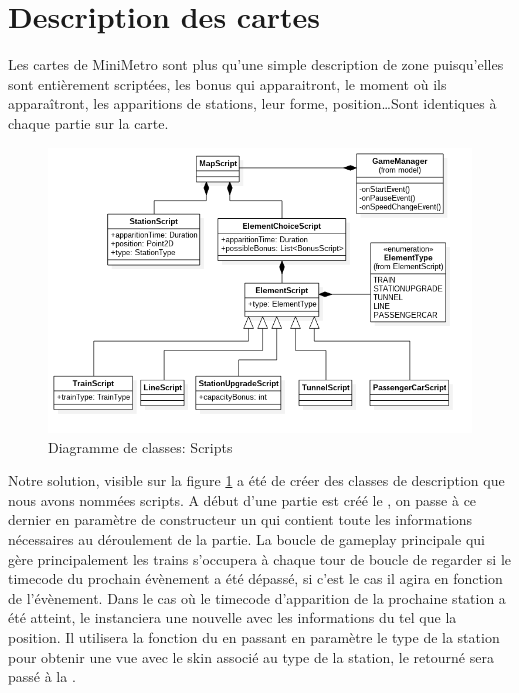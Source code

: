 \documentclass[report, backcover, french, nodocumentinfo]{upmethodology-document}
\begin{document}
		\section{Description des cartes}
				Les cartes de MiniMetro sont plus qu'une simple description de zone puisqu'elles sont entièrement scriptées, les bonus qui apparaitront, le moment où ils apparaîtront, les apparitions de stations, leur forme, position\ldots Sont identiques à chaque partie sur la carte.
				\begin{figure}[h!]
					\centering
					\includegraphics[width=\textwidth]{figures/ScriptsClassDiagram}
					\caption{Diagramme de classes: Scripts}
					\label{fig:ScriptsClassDiagram}
				\end{figure}
				Notre solution, visible sur la figure \ref{fig:ScriptsClassDiagram} a été de créer des classes de description que nous avons nommées scripts. A début d'une partie est créé le , on passe à ce dernier en paramètre de constructeur un  qui contient toute les informations nécessaires au déroulement de la partie.
				La boucle de gameplay principale qui gère principalement les trains s'occupera à chaque tour de boucle de regarder si le timecode du prochain évènement a été dépassé, si c'est le cas il agira en fonction de l'évènement.
				Dans le cas où le timecode d'apparition de la prochaine station a été atteint, le  instanciera une nouvelle  avec les informations du  tel que la position. Il utilisera la fonction  du  en passant en paramètre le type de la station pour obtenir une vue avec le skin associé au type de la station, le  retourné sera passé à la .
\end{document}
